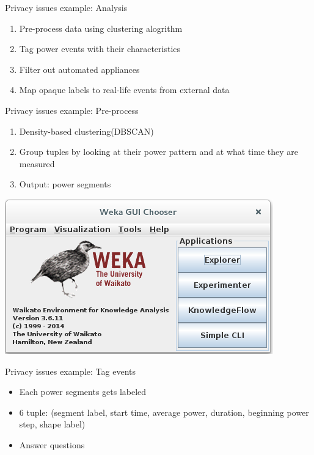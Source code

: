 \documentclass[10pt]{beamer}
\begin{document}
\begin{frame}{Privacy issues example: Analysis}
  \begin{enumerate}
    \itemsep2em 
  \item Pre-process data using clustering alogrithm
  \item Tag power events with their characteristics
  \item Filter out automated appliances
  \item Map opaque labels to real-life events from external data
  \end{enumerate}
\end{frame}

\begin{frame}{Privacy issues example: Pre-process}
  \begin{enumerate}
  \item Density-based clustering(DBSCAN)
  \item Group tuples by looking at their power pattern and at what time they are measured
  \item Output: power segments
  \end{enumerate}
  \begin{center}
  \includegraphics[scale=.3]{graphics/weka.png}   
  \end{center}
\end{frame}

\begin{frame}{Privacy issues example: Tag events}
  \begin{itemize}
  \item Each power segments gets labeled
  \item 6 tuple: (segment label, start time, average power, duration, beginning power step, shape label)
  \item Answer questions
  \end{itemize}
\end{frame}
\end{document}
